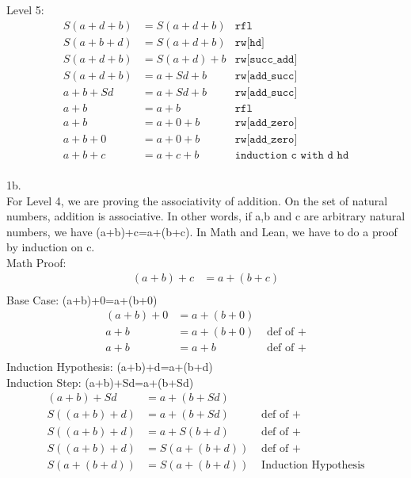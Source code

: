 \documentclass{article}
\theoremstyle{theorem}
\theoremstyle{definition}
\theoremstyle{remark}
\begin{document}
Level 5:
\begin{align*}
  S(a+d+b)&=S(a+d+b) & \texttt{rfl} \\
  S(a+b+d)&=S(a+d+b)  & \texttt{rw[hd]} \\
  S(a+d+b)&=S(a+d)+b & \texttt{rw[succ\_add]} \\
  S(a+d+b)&=a+Sd+b & \texttt{rw[add\_succ]} \\
  a+b+Sd&=a+Sd+b & \texttt{rw[add\_succ]} \\
  a+b&=a+b & \texttt{rfl} \\
  a+b&=a+0+b & \texttt{rw[add\_zero]} \\
  a+b+0&=a+0+b & \texttt{rw[add\_zero]} \\
  a+b+c&=a+c+b & \texttt{induction c with d hd} \\
\end{align*}

1b. \\

For Level 4, we are proving the associativity of addition. 
On the set of natural numbers, addition is associative. 
In other words, if a,b and c are arbitrary natural numbers, we have (a+b)+c=a+(b+c).
In Math and Lean, we have to do a proof by induction on c.\\ 

Math Proof:\\ 
\begin{align*}
  (a+b)+c&=a+(b+c) \\
\end{align*}
Base Case: (a+b)+0=a+(b+0)\\ 
\begin{align*}
  (a+b)+0&=a+(b+0)\\
  a+b&=a+(b+0) & \text{ def of } +\\
  a+b&=a+b & \text{ def of } +\\
\end{align*}
Induction Hypothesis: (a+b)+d=a+(b+d) \\
Induction Step: (a+b)+Sd=a+(b+Sd) \\
\begin{align*}
  (a+b)+Sd&=a+(b+Sd)\\
  S((a+b)+d)&=a+(b+Sd) & \text{ def of } +\\
  S((a+b)+d)&=a+S(b+d) & \text{ def of } +\\
  S((a+b)+d)&=S(a+(b+d)) & \text{ def of } +\\
  S(a+(b+d))&=S(a+(b+d)) & \text{ Induction Hypothesis}\\
\end{align*}
\end{document}
